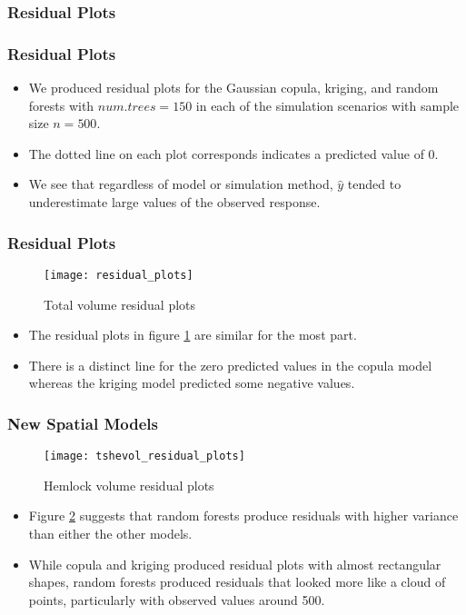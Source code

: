 \documentclass{beamer}
\begin{document}
\subsubsection{Residual Plots}

\begin{frame}
	\frametitle{Residual Plots}
	\begin{itemize}
		\item We produced residual plots for the Gaussian copula, kriging, and random forests with $num.trees=150$ in each of the simulation scenarios with sample size $n = 500$.
		\item The dotted line on each plot corresponds indicates a predicted value of 0.
		\item We see that regardless of model or simulation method, $\hat{y}$ tended to underestimate large values of the observed response.
	\end{itemize}
\end{frame}

\begin{frame}
	\frametitle{Residual Plots}
	\begin{figure}[h]
		\centering
		\texttt{[image: residual\_plots]}
		\caption{\label{fig:total_resids}Total volume residual plots}
	\end{figure}
	\begin{itemize}
		\item The residual plots in figure \ref{fig:total_resids} are similar for the most part.
		\item There is a distinct line for the zero predicted values in the copula model whereas the kriging model predicted some negative values.
	\end{itemize}
\end{frame}

\begin{frame}
	\frametitle{New Spatial Models}
	\begin{figure}[h]
		\centering
	\texttt{[image: tshevol\_residual\_plots]}
	\caption{\label{fig:hemlock_resids}Hemlock volume residual plots}
	\end{figure}
	\begin{itemize}
	\item Figure \ref{fig:hemlock_resids} suggests that random forests produce residuals with higher variance than either the other models.
	\item While copula and kriging produced residual plots with almost rectangular shapes, random forests produced residuals that looked more like a cloud of points, particularly with observed values around 500.
	\end{itemize}
\end{frame}
\end{document}
